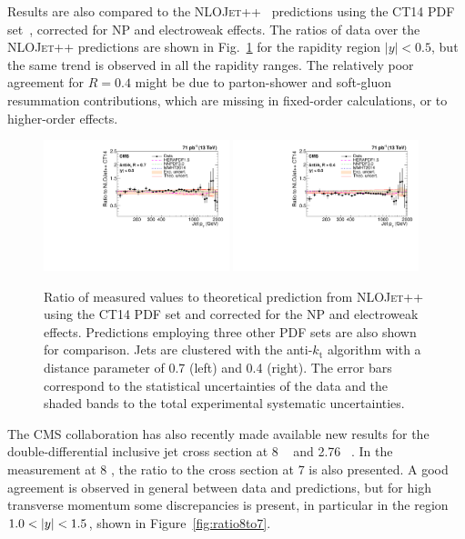\documentclass{PoS}
\providecommand{\NLOJETPP} {{\textsc{NLOJet++}}\xspace}
\providecommand{\kts}{\ensuremath{k_{\mathrm{t}}}\xspace}
\begin{document}
Results are also compared to the \NLOJETPP~\cite{Nagy:2003tz} predictions using the CT14 PDF set~\cite{Dulat:2015mca}, corrected for NP and electroweak effects.
The ratios of data over the \NLOJETPP predictions are shown in Fig.~\ref{fig:ratio_CT14} for the rapidity region
$|y|<0.5$, but the same trend is observed in all the rapidity ranges. The relatively poor agreement for $R = 0.4$ might
be due to parton-shower and soft-gluon resummation contributions, which are missing in fixed-order calculations, or to
higher-order effects. 

\begin{figure}[htbp]
  \includegraphics[width=0.48\textwidth]{Figure2-a.pdf}
  \includegraphics[width=0.48\textwidth]{Figure2-b.pdf}
  \caption{Ratio of measured values to theoretical prediction from \NLOJETPP using the CT14 PDF set and corrected for
the NP and electroweak effects. Predictions employing three other PDF sets are also shown for comparison. Jets are
clustered with the anti-\kts algorithm with a distance parameter of
0.7 (left) and 0.4 (right). The error bars correspond to the statistical
uncertainties of the data and the shaded bands to the total experimental systematic uncertainties.}
  \label{fig:ratio_CT14}
\end{figure}

The CMS collaboration has also recently made available new results for the double-differential inclusive jet cross section at 8
\TeV~\cite{CMS:2015haa} and 2.76 \TeV~\cite{Khachatryan:2015luy}. In the measurement at 8 \TeV, the ratio to the
cross section at 7 \TeV is also presented. A good agreement is observed in general between data and predictions, but for high
transverse momentum some discrepancies is present, in particular in the region $1.0 < \lvert y \rvert < 1.5$, shown in
Figure~\ref{fig:ratio8to7}.
\end{document}
